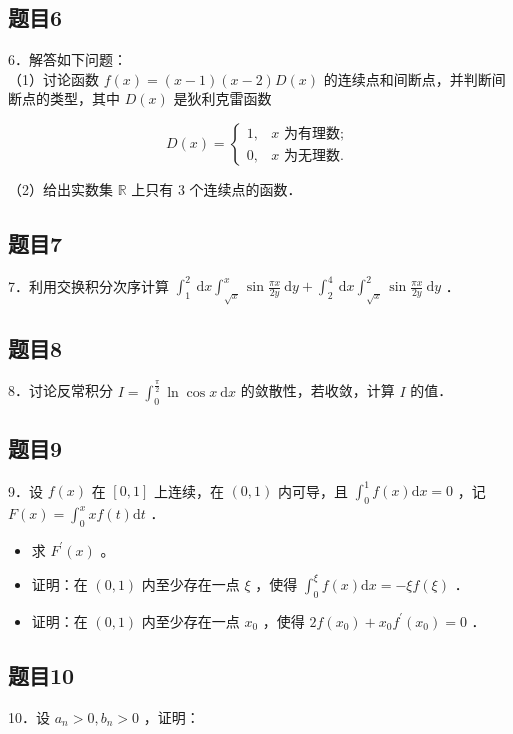 \documentclass{article}
\begin{document}
\subsection{题目6}
6．解答如下问题：\\
（1）讨论函数 \(f(x)=(x-1)(x-2) D(x)\) 的连续点和间断点，并判断间断点的类型，其中 \(D(x)\) 是狄利克雷函数

\[
D(x)= \begin{cases}1, & x \text { 为有理数; } \\ 0, & x \text { 为无理数. }\end{cases}
\]

（2）给出实数集 \(\mathbb{R}\) 上只有 3 个连续点的函数．

\subsection{题目7}
7．利用交换积分次序计算 \(\int_{1}^{2} \mathrm{~d} x \int_{\sqrt{x}}^{x} \sin \frac{\pi x}{2 y} \mathrm{~d} y+\int_{2}^{4} \mathrm{~d} x \int_{\sqrt{x}}^{2} \sin \frac{\pi x}{2 y} \mathrm{~d} y\) ．

\subsection{题目8}
8．讨论反常积分 \(I=\int_{0}^{\frac{\pi}{2}} \ln \cos x \mathrm{~d} x\) 的敛散性，若收敛，计算 \(I\) 的值．

\subsection{题目9}
9．设 \(f(x)\) 在 \([0,1]\) 上连续，在 \((0,1)\) 内可导，且 \(\int_{0}^{1} f(x) \mathrm{d} x=0\) ，记 \(F(x)=\int_{0}^{x} x f(t) \mathrm{d} t\) ．

\begin{itemize}
  \item[（1）] 求 \(F^{\prime}(x)\) 。
  \item[（2）] 证明：在 \((0,1)\) 内至少存在一点 \(\xi\) ，使得 \(\int_{0}^{\xi} f(x) \mathrm{d} x=-\xi f(\xi)\) ．
  \item[（3）] 证明：在 \((0,1)\) 内至少存在一点 \(x_{0}\) ，使得 \(2 f\left(x_{0}\right)+x_{0} f^{\prime}\left(x_{0}\right)=0\) ．
\end{itemize}

\subsection{题目10}
10．设 \(a_{n}>0, b_{n}>0\) ，证明：
\end{document}
